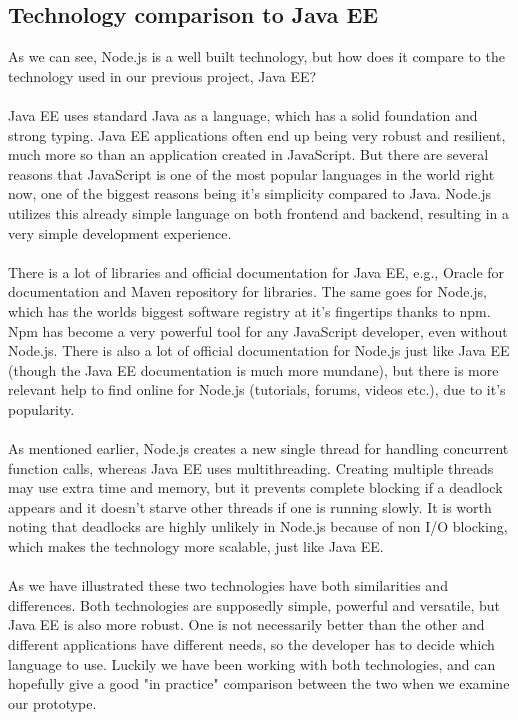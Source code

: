 \subsection{Technology comparison to Java EE}
As we can see, Node.js is a well built technology, but how does it compare to the technology used in our previous project, Java EE? 
\\\\
Java EE uses standard Java as a language, which has a solid foundation and strong typing. Java EE applications often end up being very robust and resilient, much more so than an application created in JavaScript. But there are several reasons that JavaScript is one of the most popular languages in the world right now, one of the biggest reasons being it's simplicity compared to Java. Node.js utilizes this already simple language on both frontend and backend, resulting in a very simple development experience. 
\\\\
There is a lot of libraries and official documentation for Java EE, e.g., Oracle for documentation and Maven repository for libraries. The same goes for Node.js, which has the worlds biggest software registry at it's fingertips thanks to npm. Npm has become a very powerful tool for any JavaScript developer, even without Node.js. There is also a lot of official documentation for Node.js just like Java EE (though the Java EE documentation is much more mundane), but there is more relevant help to find online for Node.js (tutorials, forums, videos etc.), due to it's popularity.
\\\\
As mentioned earlier, Node.js creates a new single thread for handling concurrent function calls, whereas Java EE uses multithreading. Creating multiple threads may use extra time and memory, but it prevents complete blocking if a deadlock appears and it doesn't starve other threads if one is running slowly. It is worth noting that deadlocks are highly unlikely in Node.js because of non I/O blocking, which makes the technology more scalable, just like Java EE. \cite{compare:javanode} 
\\\\
As we have illustrated these two technologies have both similarities and differences. Both technologies are supposedly simple, powerful and versatile, but Java EE is also more robust. One is not necessarily better than the other and different applications have different needs, so the developer has to decide which language to use. Luckily we have been working with both technologies, and can hopefully give a good "in practice" comparison between the two when we examine our prototype. 